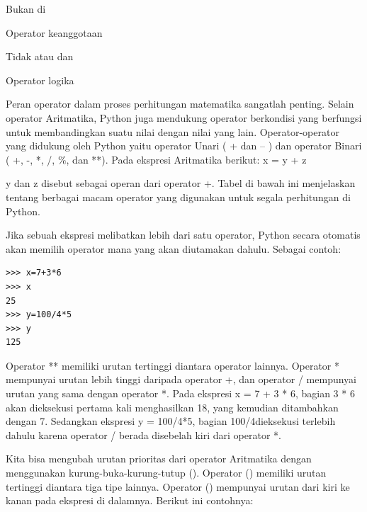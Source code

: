 \noindent
Bukan di \par
\noindent
Operator keanggotaan \par
\vspace{12pt}
\noindent
Tidak atau dan \par
\noindent
Operator logika \par
\vspace{12pt}
\noindent
Peran operator dalam proses perhitungan matematika sangatlah penting. Selain $  $operator Aritmatika, Python juga mendukung $  $operator berkondisi $  $yang berfungsi untuk membandingkan suatu nilai dengan nilai yang lain. Operator-operator yang didukung oleh Python yaitu $  $operator Unari $  $( + dan – ) dan $  $operator Binari $  $( +, -, *, /,  $  \%  $, dan **). Pada ekspresi Aritmatika berikut:\vspace{\baselineskip}
\vspace{\baselineskip}
x = y + z \par
\noindent
y $  $dan $  $z $  $disebut sebagai operan dari operator $  $+. Tabel di bawah ini menjelaskan tentang berbagai macam operator yang digunakan untuk segala perhitungan di Python. \par
\vspace{12pt}
\noindent
Jika sebuah ekspresi melibatkan lebih dari satu operator, Python secara otomatis akan memilih operator mana yang akan diutamakan dahulu. Sebagai contoh: \par
\begin{verbatim}
>>> x=7+3*6
>>> x
25
>>> y=100/4*5
>>> y
125

\end{verbatim}
Operator $  $** $  $memiliki urutan tertinggi diantara operator lainnya. Operator $  $* $  $mempunyai urutan lebih tinggi daripada operator $  $+, dan operator $  $/ $  $mempunyai urutan yang sama dengan operator $  $*. Pada ekspresi $  $x = 7 + 3 * 6, bagian $  $3 * 6 $  $akan dieksekusi pertama kali menghasilkan $  $18, yang kemudian ditambahkan dengan $  $7. Sedangkan ekspresi $  $y = 100/4*5, bagian $  $100/4dieksekusi terlebih dahulu karena operator $  $/ $  $berada disebelah kiri dari operator $  $*. \par
\vspace{12pt}
\noindent
Kita bisa mengubah urutan prioritas dari operator Aritmatika dengan menggunakan kurung-buka-kurung-tutup $  $(). Operator $  $() $  $memiliki urutan tertinggi diantara tiga tipe lainnya. Operator $  $() $  $mempunyai urutan dari kiri ke kanan pada ekspresi di dalamnya. Berikut ini contohnya: \par
